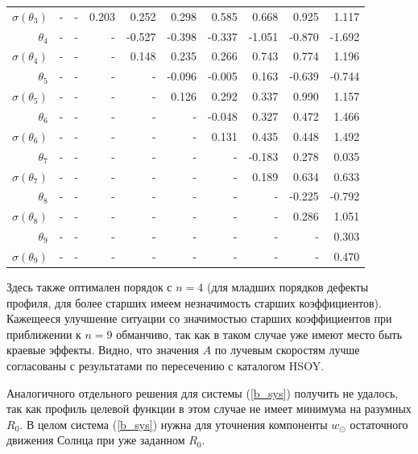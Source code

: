 \documentclass{matmex-diploma-custom}
\begin{document}
\begin{table}[h!!]
\begin{tabular}{r|rrr|r|rrrrr}
 $\sigma(\theta_3)$&-      &    - &   0.203 &   0.252 &   0.298 &   0.585 &   0.668 &   0.925 &   1.117  \\
 $\theta_4$&-      &    - &    - &  -0.527 &  -0.398 &  -0.337 &  -1.051 &  -0.870 &  -1.692  \\
 $\sigma(\theta_4)$&-      &    - &    - &    0.148 &   0.235 &   0.266 &   0.743 &   0.774 &   1.196  \\
 $\theta_5$&-      &    - &    - &    - &  -0.096 &  -0.005 &   0.163 &  -0.639 &  -0.744  \\
 $\sigma(\theta_5)$&-      &    - &    - &    - &    0.126 &   0.292 &   0.337 &   0.990 &   1.157  \\
 $\theta_6$&-      &    - &    - &    - &    - &   -0.048 &   0.327 &   0.472 &   1.466  \\
 $\sigma(\theta_6)$&-    &    - &    - &    - &    - &   0.131 &   0.435 &   0.448 &   1.492  \\
 $\theta_7$&-     &    - &    - &    - &    - &    - &  -0.183 &   0.278 &   0.035  \\
 $ \sigma(\theta_7)$&-     &    - &    - &    - &    - &    - &     0.189 &   0.634 &   0.633  \\
 $\theta_8$&-     &    - &    - &    - &    - &    - &    - &   -0.225 &  -0.792  \\
 $ \sigma(\theta_8)$&-     &    - &    - &    - &    - &    - &    - &    0.286 &   1.051  \\
 $\theta_9$&-     &    - &    - &    - &    - &    - &    - &    - &  0.303  \\
 $ \sigma(\theta_9)$&-     &    - &    - &    - &    - &    - &    - &    - &   0.470  \\
\end{tabular}
\end{table}

\par Здесь также оптимален порядок с $n=4$ (для младших порядков дефекты профиля, для более старших имеем незначимость старших коэффициентов). Кажещееся улучшение ситуации со значимостью старших коэффициентов при приближении к $n=9$ обманчиво, так как в таком случае уже имеют место быть краевые эффекты. Видно, что значения $A$ по лучевым скоростям лучше согласованы с результатами по пересечению с каталогом HSOY.

Аналогичного отдельного решения для системы (\ref{b_sys}) получить не удалось, так как профиль целевой функции в этом случае не имеет минимума на разумных $R_0$. В целом система (\ref{b_sys}) нужна для уточнения компоненты $w_{\odot}$ остаточного движения Солнца при уже заданном $R_0$.
\end{document}
